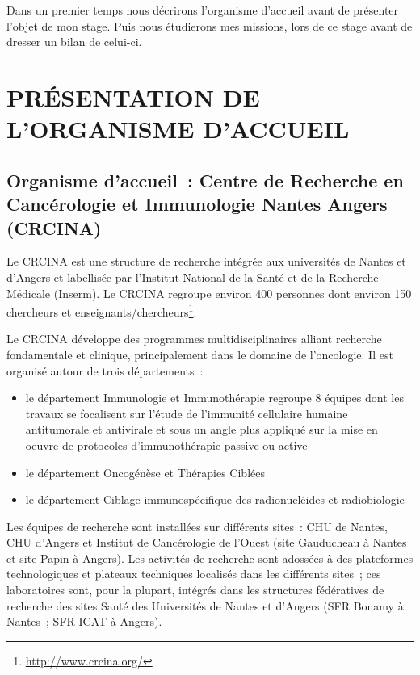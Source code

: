 \documentclass[a4paper,10pt]{article}
\begin{document}
Dans un premier temps nous décrirons l’organisme d’accueil avant de présenter l’objet de mon stage. Puis nous étudierons mes missions, lors de ce stage avant de dresser un bilan de celui-ci.
\section{PR\'{E}SENTATION DE L'ORGANISME D'ACCUEIL }
\subsection{Organisme d’accueil : Centre de Recherche en Cancérologie et Immunologie Nantes Angers (CRCINA)}
Le CRCINA est une structure de recherche intégrée aux universités de Nantes et d’Angers et labellisée par l’Institut National de la Santé et de la Recherche Médicale (Inserm). 
Le CRCINA regroupe environ 400 personnes dont environ 150 chercheurs et enseignants/chercheurs\footnote{\url{http://www.crcina.org/}}.

Le CRCINA développe des programmes multidisciplinaires alliant recherche fondamentale et clinique, principalement dans le domaine de l’oncologie. Il est organisé autour de trois départements :
\begin{itemize}
 \item le département \textgravedbl Immunologie et Immunothérapie \textacutedbl  regroupe 8 équipes dont les travaux se focalisent sur l’étude de l’immunité cellulaire humaine antitumorale et antivirale et sous un angle plus appliqué sur la mise en oeuvre de protocoles d’immunothérapie passive ou active
\item le département \textgravedbl Oncogénèse et Thérapies Ciblées \textacutedbl
\item le département \textgravedbl Ciblage immunospécifique des radionucléides et radiobiologie \textacutedbl 
\end{itemize}
Les équipes de recherche sont installées sur différents sites : CHU de Nantes, CHU d’Angers et Institut de Cancérologie de l’Ouest (site Gauducheau à Nantes et site Papin à Angers).
Les activités de recherche sont adossées à des plateformes technologiques et plateaux techniques localisés dans les différents sites ; ces laboratoires sont, pour la plupart, intégrés dans les structures fédératives de recherche des sites Santé des Universités de Nantes et d’Angers (SFR Bonamy à Nantes ; SFR ICAT à Angers).
\end{document}
